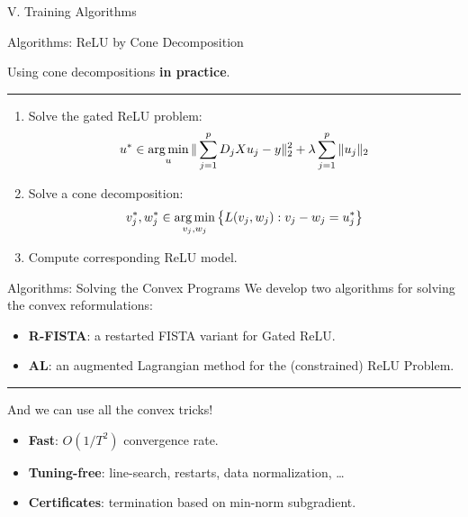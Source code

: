\documentclass[usenames,dvipsnames,mathserif,notheorems]{beamer}
\newcommand{\horizontalrule}{
	{
			\vspace{-0.5em}
			\center \rule{\textwidth}{0.1em}
			\vspace{-0.2em}
		}
}
\begin{document}
\begin{frame}{}
	\begin{center}
		\huge V. Training Algorithms
	\end{center}
\end{frame}

\begin{frame}{Algorithms: ReLU by Cone Decomposition}
	\begin{center}
		\large Using cone decompositions \textbf{in practice}.
	\end{center}

	\pause
	\horizontalrule

	\begin{enumerate}
		\item Solve the gated ReLU problem:
		      \[
			      u^* \in \mathop{\rm arg\,min}_{u} \|\sum_{j=1}^p D_j X u_j - y\|_2^2 + \lambda \sum_{j=1}^p \|u_j\|_2
		      \]
		      \pause
		\item Solve a cone decomposition:
		      \[
			      v_j^*, w_j^* \in \mathop{\rm arg\,min}_{v_j, w_j} \left\{ L(v_j, w_j) : v_j - w_j = u^*_j\right\}
		      \]
		      \pause

		\item Compute corresponding ReLU model.
	\end{enumerate}

\end{frame}

\begin{frame}{Algorithms: Solving the Convex Programs}
	We develop two algorithms for solving the convex reformulations:

	\vspace{1em}

	\begin{itemize}
		\item \textbf{R-FISTA}: a restarted FISTA variant for Gated ReLU.
		      \vspace{0.5em}
		\item \textbf{AL}: an augmented Lagrangian method for the (constrained) ReLU Problem.
	\end{itemize}

	\pause
	\horizontalrule

	And we can use all the convex tricks!
	\vspace{1em}
	\begin{itemize}
		\item \textbf{Fast}: \( O(1/T^2) \) convergence rate.
		      \vspace{0.5em}

		\item \textbf{Tuning-free}: line-search, restarts, data normalization, \ldots
		      \vspace{0.5em}

		\item \textbf{Certificates}: termination based on min-norm subgradient.
	\end{itemize}

\end{frame}
\end{document}

